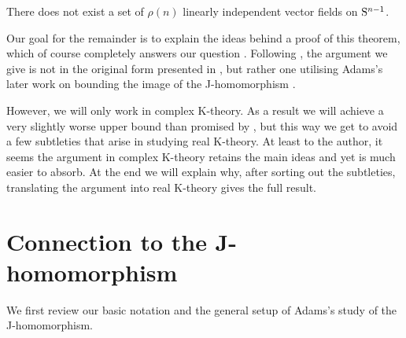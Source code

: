 \begin{theorem}
  \label{vfield-upper-bound}
  There does not exist a set of $\rho(n)$ linearly independent vector
  fields on $\S^{n-1}$.
\end{theorem}

Our goal for the remainder is to explain the ideas behind a proof of
this theorem, which of course completely answers our question
. Following \cite{miller-vfields}, the argument we
give is not in the original form presented in \cite{adams-vfields},
but rather one utilising Adams's later work on bounding the image of
the J-homomorphism \cite{adams-J-II}.

However, we will only work in complex K-theory. As a result we will
achieve a very slightly worse upper bound than promised by
, but this way we get to avoid a few
subtleties that arise in studying real K-theory. At least to the
author, it seems the argument in complex K-theory retains the main
ideas and yet is much easier to absorb. At the end we will explain
why, after sorting out the subtleties, translating the argument into
real K-theory gives the full result.


\section{Connection to the J-homomorphism}

We first review our basic notation and the general setup of Adams's
study of the J-homomorphism.

